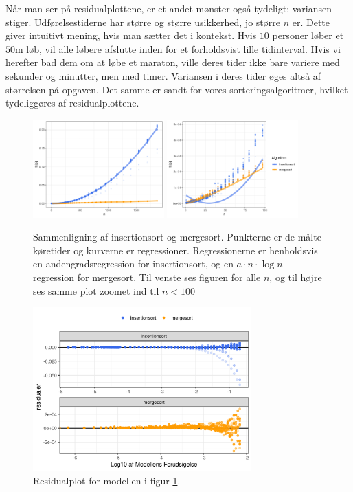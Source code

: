 Når man ser på residualplottene, er et andet mønster også tydeligt: variansen stiger. Udførelsestiderne har større og større usikkerhed, jo større $n$ er. Dette giver intuitivt mening, hvis man sætter det i kontekst. Hvis $10$ personer løber et $50$m løb, vil alle løbere afslutte inden for et forholdsvist lille tidinterval. Hvis vi herefter bad dem om at løbe et maraton, ville deres tider ikke bare variere med sekunder og minutter, men med timer. Variansen i deres tider øges altså af størrelsen på opgaven. Det samme er sandt for vores sorteringsalgoritmer, hvilket tydeliggøres af residualplottene. 

\begin{figure} \centering
	\includegraphics[width=0.45\textwidth]{../img/toAlgoritmer.png}
	\includegraphics[width=0.45\textwidth]{../img/toAlgoritmerZoomed}
	\caption{Sammenligning af insertionsort og mergesort. Punkterne er de målte køretider og kurverne er regressioner. Regressionerne er henholdsvis en andengradsregression for insertionsort, og en $a \cdot n \cdot \log n$-regression for mergesort. Til venste ses figuren for alle $n$, og til højre ses samme plot zoomet ind til $n < 100$ }
	\label{fig:plot - to algoritmer}
\end{figure}

\begin{figure}
	\begin{center}
		\includegraphics[width=0.75\textwidth]{../img/toAlgoritmerResidual.png}
	\end{center}
	\caption{Residualplot for modellen i figur \ref{fig:plot - to algoritmer}.}
	\label{fig:toAlgoritmerResidual}
\end{figure}



